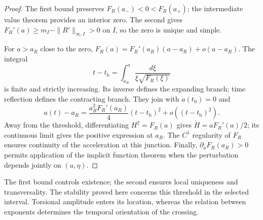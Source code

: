 \begin{proof}
The first bound preserves
\(F_R(a_-)<0<F_R(a_+)\); the intermediate value theorem provides
an interior zero. The second gives
\(F_R'(a)\geq m_I-\|R'\|_{\infty,I}>0\) on \(I\), so the zero
is unique and simple.

For \(a>a_R\) close to the zero,
\(F_R(a)=F_R'(a_R)(a-a_R)+o(a-a_R)\).
The integral
\[
 t-t_{\mathrm b}=\int_{a_R}^{a}
          \frac{d\xi}{\xi\sqrt{F_R(\xi)}}
\]
is finite and strictly increasing. Its inverse defines the expanding
branch; time reflection defines the contracting branch.
They join with \(\dot a(t_{\mathrm b})=0\) and
\[
 a(t)-a_R
 =\frac{a_R^2F_R'(a_R)}4(t-t_{\mathrm b})^2
   +o((t-t_{\mathrm b})^2).
\]
Away from the threshold, differentiating \(H^2=F_R(a)\) gives
\(\dot H=aF_R'(a)/2\); its continuous limit gives the positive
expression at \(a_R\). The \(C^1\) regularity of \(F_R\) ensures
continuity of the acceleration at this junction. Finally,
\(\partial_aF_R(a_R)>0\) permits application of the implicit function
theorem when the perturbation depends jointly on \((a,\eta)\).
\end{proof}

The first bound controls existence; the second ensures local
uniqueness and transversality. The stability proved here concerns
this threshold in the selected interval. Torsional amplitude enters
its location, whereas the relation between exponents determines
the temporal orientation of the crossing.

\par\endgroup
